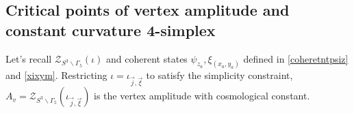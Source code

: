 \documentclass[aps,prd,notitlepage,nofootinbib,superscriptaddress,groupedaddress,twocolumn]{revtex4-1}
\def\be{\begin{eqnarray}}
\def\ee{\end{eqnarray}}
\begin{document}
\subsection{Critical points of vertex amplitude and constant curvature 4-simplex}\label{Critical points of vertex amplitude and constant curvature 4-simplex}



Let's recall $\mathcal{Z}_{S^{3} \backslash \Gamma_{5}}(\iota)$ %
and coherent states $\psi_{z_{a}},\xi_{\left(x_{a}, y_{a}\right)}$ defined in \eqref{coheretntpsiz} and \eqref{xixym}. Restricting $\iota =\iota_{\vec{j},\vec{\xi}}$ to satisfy the simplicity constraint, $A_v=\mathcal{Z}_{S^{3} \backslash \Gamma_{5}}(\iota_{\vec{j},\vec{\xi}})$ is the vertex amplitude with cosmological constant. 
\end{document}
